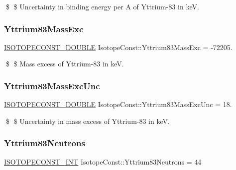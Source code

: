 \$ \$ Uncertainty in binding energy per A of Yttrium-\/83 in keV. \mbox{\label{group___isotope_const-_yttrium-_y83_gad1478f28c5b78687b864645072ab4b25}} 
\subsubsection{\texorpdfstring{Yttrium83\+Mass\+Exc}{Yttrium83MassExc}}
{\footnotesize\ttfamily \mbox{\hyperlink{group___isotope_const-_macros_ga8f45a7272ce02c0b4c65c44636ed719a}{I\+S\+O\+T\+O\+P\+E\+C\+O\+N\+S\+T\+\_\+\+D\+O\+U\+B\+LE}} Isotope\+Const\+::\+Yttrium83\+Mass\+Exc = -\/72205.}

\$ \$ Mass excess of Yttrium-\/83 in keV. \mbox{\label{group___isotope_const-_yttrium-_y83_ga738fd0c9d19aeaddffccf60985d93a9c}} 
\subsubsection{\texorpdfstring{Yttrium83\+Mass\+Exc\+Unc}{Yttrium83MassExcUnc}}
{\footnotesize\ttfamily \mbox{\hyperlink{group___isotope_const-_macros_ga8f45a7272ce02c0b4c65c44636ed719a}{I\+S\+O\+T\+O\+P\+E\+C\+O\+N\+S\+T\+\_\+\+D\+O\+U\+B\+LE}} Isotope\+Const\+::\+Yttrium83\+Mass\+Exc\+Unc = 18.}

\$ \$ Uncertainty in mass excess of Yttrium-\/83 in keV. \mbox{\label{group___isotope_const-_yttrium-_y83_ga3cf5ce68a7fac6a28c3dfaef41f5d0b7}} 
\subsubsection{\texorpdfstring{Yttrium83\+Neutrons}{Yttrium83Neutrons}}
{\footnotesize\ttfamily \mbox{\hyperlink{group___isotope_const-_macros_ga5f18360b3e99483a35c32d789e62621c}{I\+S\+O\+T\+O\+P\+E\+C\+O\+N\+S\+T\+\_\+\+I\+NT}} Isotope\+Const\+::\+Yttrium83\+Neutrons = 44}

